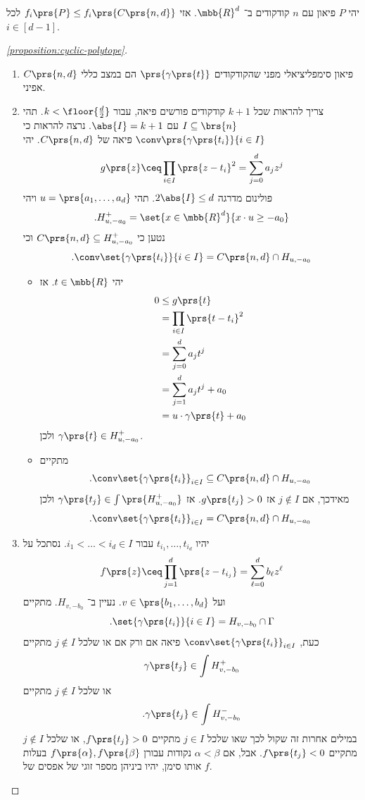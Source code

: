 \documentclass[a4paper,10pt,twoside,openany]{book}
\begin{document}
\begin{theorem} \label{theorem:UBT}
יהי
$P$
פיאון עם
$n$
קודקודים ב־%
$\mbb{R}^d$.
אזי
$f_i\prs{P} \leq f_i\prs{C\prs{n,d}}$
לכל
$i \in [d-1]$.
\end{theorem}


\begin{proof}[\ref{proposition:cyclic-polytope}]
\begin{enumerate}
\item%
$C\prs{n,d}$
פיאון סימפליציאלי מפני שהקודקודים
$\prs{\gamma\prs{t}}$
הם במצב כללי אפיני.
\item%
צריך להראות שכל
$k+1$
קודקודים פורשים פיאה, עבור
$k < \floor{\frac{d}{2}}$.
תהי
$I \subseteq \brs{n}$
עם
$\abs{I} = k+1$.
נרצה להראות כי
$\conv\prs{\gamma\prs{t_i}}{i \in I}$
פיאה של
$C\prs{n,d}$.
יהי
\[g\prs{z} \ceq \prod_{i \in I}\prs{z-t_i}^2 = \sum_{j=0}^d a_j z^j\]
פולינום מדרגה
$2\abs{I} \leq d$.
תהי
$u = \prs{a_1, \ldots, a_d}$
ויהי
\[\text{.} H_{u,-a_0}^+ = \set{x \in \mbb{R}^d}{x \cdot u \geq - a_0}\]
נטען כי
$C\prs{n,d} \subseteq H_{u,-a_0}^+$
וכי
\[\text{.} \conv\set{\gamma\prs{t_i}}{i \in I} = C\prs{n,d} \cap H_{u, -a_0}\]

\begin{itemize}
\item יהי
$t \in \mbb{R}$.
אז
\begin{align*}
0 &\leq g\prs{t}
\\&= \prod_{i \in I} \prs{t - t_i}^2
\\&= \sum_{j=0}^d a_j t^j
\\&= \sum_{j=1}^d a_j t^j + a_0
\\&= u \cdot \gamma\prs{t} + a_0
\end{align*}
ולכן
$\gamma\prs{t} \in H_{u, -a_0}^+$.
\item 
מתקיים
\[\text{.} \conv\set{\gamma\prs{t_i}}_{i \in I} \subseteq C\prs{n,d} \cap H_{u,-a_0}\]
מאידכך, אם
$j \notin I$
אז
$g\prs{t_j} > 0$.
אז
$\gamma\prs{t_j} \in \int \prs{H_{u,-a_0}^+}$
ולכן
\[\text{.} \conv\set{\gamma\prs{t_i}}_{i \in I} = C\prs{n,d} \cap H_{u,-a_0}\]
\end{itemize}

\item%

יהיו
$t_{i_1}, \ldots, t_{i_d}$
עבור
$i_1 < \ldots < i_d \in I$.
נסתכל על
\[f\prs{z} \ceq \prod_{j=1}^d \prs{z-t_{i_j}} = \sum_{\ell = 0}^d b_\ell z^\ell\]
ועל
$v \in \prs{b_1, \ldots, b_d}$.
נעיין ב־%
$H_{v, - b_0}$.
מתקיים
\[\text{.} \set{\gamma \prs{t_i}}{i \in I} = H_{v,-b_0} \cap \Gamma\]
כעת,
$\conv \set{\gamma\prs{t_i}}_{i \in I}$
פיאה אם ורק אם או שלכל
$j \notin I$
מתקיים
\[\gamma\prs{t_j} \in \int H_{v, -b_0}^+\]
או שלכל
$j \notin I$
מתקיים
\[\text{.} \gamma\prs{t_j} \in \int H_{v, -b_0}^-\]
במילים אחרות זה שקול לכך שאו שלכל
$j \in I$
מתקיים
$f\prs{t_j} > 0$,
או שלכל
$j \notin I$
מתקיים
$f\prs{t_j} < 0$.
אבל, אם
$\alpha < \beta$
נקודות עבורן
$f\prs{\alpha}, f\prs{\beta}$
בעלות אותו סימן, יהיו ביניהן מספר זוגי של אפסים של
$f$.


\end{enumerate}
\end{proof}
\end{document}

